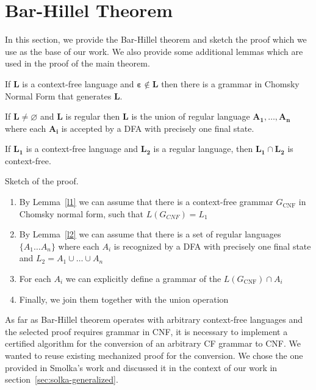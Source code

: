 \documentclass[runningheads]{llncs}
\begin{document}
\section{Bar-Hillel Theorem}
\label{sec:b-h-th}

In this section, we provide the Bar-Hillel theorem and sketch the proof which we use as the base of our work.
We also provide some additional lemmas which are used in the proof of the main theorem.

\begin{lemma} \label{l1}
	If $\boldsymbol{L}$ is a context-free language and $\boldsymbol{\varepsilon} \notin \boldsymbol{L}$ then there is a grammar in Chomsky Normal Form that generates $\boldsymbol{L}$.
\end{lemma}

\begin{lemma} \label{l2}
	If $ \boldsymbol{L} \neq \varnothing $ and $\boldsymbol{L}$ is regular then $\boldsymbol{L}$ is the union of regular language $\boldsymbol{A_1}, \ldots , \boldsymbol{A_n}$ where each $\boldsymbol{A_i}$ is accepted by a DFA with precisely one final state.
\end{lemma}

\begin{theorem}
	If $\boldsymbol{L_1}$ is a context-free language and $\boldsymbol{L_2}$ is a regular language, then $\boldsymbol{L_1} \cap \boldsymbol{L_2}$ is context-free.
\end{theorem}


Sketch of the proof.
\begin{enumerate}
	\item By Lemma~\ref{l1} we can assume that there is a context-free grammar $G_{\text{CNF}}$ in Chomsky normal form, such that $L(G_{CNF}) = L_1$
	\item By Lemma~\ref{l2} we can assume that there is a set of regular languages $\{A_{1} \ldots A_n \}$ where each $A_i$ is recognized by a DFA with precisely one final state and $L_2 = A_1 \cup \ldots \cup A_n$
	\item For each $A_i$ we can explicitly define a grammar of the $L( G_{\text{CNF}} ) \cap A_i$
	\item Finally, we join them together with the union operation
\end{enumerate}

As far as Bar-Hillel theorem operates with arbitrary context-free languages and the selected proof requires grammar in CNF, it is necessary to implement a certified algorithm for the conversion of an arbitrary CF grammar to CNF.
We wanted to reuse existing mechanized proof for the conversion.
We chose the one provided in Smolka's work and discussed it in the context of our work in section~\ref{sec:solka-generalized}.
\end{document}
